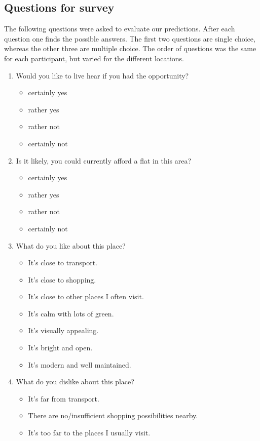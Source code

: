 \documentclass[letterpaper]{article}
\begin{document}
\subsection{Questions for survey}\label{app:questions}
The following questions were asked to evaluate our predictions. After each question one finds the possible answers. The first two questions are single choice, whereas the other three are multiple choice. The order of questions was the same for each participant, but varied for the different locations.
\begin{enumerate}
	\item Would you like to live hear if you had the opportunity?
	\begin{itemize}
		\item certainly yes
		\item rather yes
		\item rather not
		\item certainly not
	\end{itemize}
	\item Is it likely, you could currently afford a flat in this area?
	\begin{itemize}
		\item certainly yes
		\item rather yes
		\item rather not
		\item certainly not
	\end{itemize}
	\item What do you like about this place?
	\begin{itemize}
		\item It's close to transport.
		\item It's close to shopping.
		\item It's close to other places I often visit.
		\item It's calm with lots of green.
		\item It's visually appealing.
		\item It's bright and open.
		\item It's modern and well maintained.
	\end{itemize}
	\item What do you dislike about this place?
	\begin{itemize}
		\item It's far from transport.
		\item There are no/insufficient shopping possibilities nearby.
		\item It's too far to the places I usually visit.

\end{itemize}
\end{enumerate}
\end{document}
